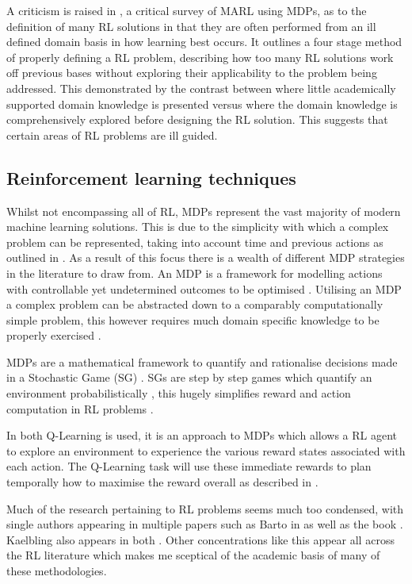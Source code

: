 \documentclass[10pt,journal]{IEEEtran}
\begin{document}
A criticism is raised in \cite{Shoham}, a critical survey of MARL using MDPs, as to the definition of many RL solutions in that they are often performed from an ill defined domain basis in how learning best occurs. It outlines a four stage method of properly defining a RL problem, describing how too many RL solutions work off previous bases without exploring their applicability to the problem being addressed. 
This demonstrated by the contrast between \cite{Amato} where little academically supported domain knowledge is presented versus \cite{Ng} where the domain knowledge is comprehensively explored before designing the RL solution. This suggests that certain areas of RL problems are ill guided.

\subsection{Reinforcement learning techniques}
Whilst not encompassing all of RL, MDPs represent the vast majority of modern machine learning solutions. This is due to the simplicity with which a complex problem can be represented, taking into account time and previous actions as outlined in \cite{Barto}. As a result of this focus there is a wealth of different MDP strategies in the literature to draw from. An MDP is a framework for modelling actions with controllable yet undetermined outcomes to be optimised \cite{Bellman}. Utilising an MDP a complex problem can be abstracted down to a comparably computationally simple problem, this however requires much domain specific knowledge to be properly exercised \cite{Shoham}.

MDPs are a mathematical framework to quantify and rationalise decisions made in a Stochastic Game (SG) \cite{Bellman}. SGs are step by step games which quantify an environment probabilistically \cite{Shapley}, this hugely simplifies reward and action computation in RL problems \cite{Busoniu}.

In both \cite{Bellemare, Amato} Q-Learning is used, it is an approach to MDPs which allows a RL agent to explore an environment to experience the various reward states associated with each action. The Q-Learning task will use these immediate rewards to plan temporally how to maximise the reward overall as described in \cite{Watkins92}. 

Much of the research pertaining to RL problems seems much too condensed, with single authors appearing in multiple papers such as Barto in \cite{Barto} as well as the book \cite{Sutton}. Kaelbling also appears in both \cite{Kaelbling, Smart}. Other concentrations like this appear all across the RL literature which makes me sceptical of the academic basis of many of these methodologies. 
\end{document}
